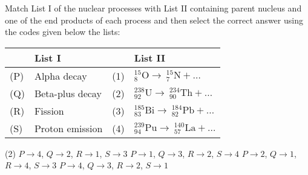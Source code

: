 
\item Match List I of the nuclear processes with List II containing parent nucleus and one of the end products of each process and then select the correct answer using the codes given below the lists:

\begin{center}
    \renewcommand{\arraystretch}{2}
    \begin{table}[h]
        \centering
        \begin{tabular}{p{0.25cm}p{8cm}|p{0.25cm}p{5cm}}
        \hline
        & List I & &List II\\
        \hline
        (P)& Alpha decay & (1) & $_8^{15}\mathrm{O} \rightarrow\ _7^{15}\mathrm{N} + \ldots$ \\
        (Q)& Beta-plus decay & (2) & $_{92}^{238}\mathrm{U} \rightarrow\ _{90}^{234}\mathrm{Th} + \ldots$ \\
        (R)& Fission & (3) & $_{83}^{185}\mathrm{Bi} \rightarrow\ _{82}^{184}\mathrm{Pb} + \ldots$ \\
        (S)& Proton emission & (4) & $_{94}^{239}\mathrm{Pu} \rightarrow\ _{57}^{140}\mathrm{La} + \ldots$ \\
        \hline
        \end{tabular}
    \end{table}
\end{center}

\begin{tasks}(2)
    \task $P \rightarrow 4$, $Q \rightarrow 2$, $R \rightarrow 1$, $S \rightarrow 3$
    \task $P \rightarrow 1$, $Q \rightarrow 3$, $R \rightarrow 2$, $S \rightarrow 4$
    \task $P \rightarrow 2$, $Q \rightarrow 1$, $R \rightarrow 4$, $S \rightarrow 3$
    \task $P \rightarrow 4$, $Q \rightarrow 3$, $R \rightarrow 2$, $S \rightarrow 1$
\end{tasks}
